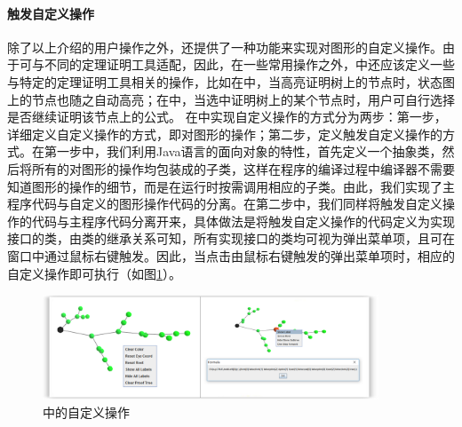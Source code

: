 \paragraph{触发自定义操作}
除了以上介绍的用户操作之外，还提供了一种功能来实现对图形的自定义操作。由于可与不同的定理证明工具适配，因此，在一些常用操作之外，中还应该定义一些与特定的定理证明工具相关的操作，比如在\sctlprov{}中，当高亮证明树上的节点时，状态图上的节点也随之自动高亮；在中，当选中证明树上的某个节点时，用户可自行选择是否继续证明该节点上的公式。
在中实现自定义操作的方式分为两步：第一步，详细定义自定义操作的方式，即对图形的操作；第二步，定义触发自定义操作的方式。在第一步中，我们利用Java语言的面向对象的特性，首先定义一个抽象类，然后将所有的对图形的操作均包装成的子类，这样在程序的编译过程中编译器不需要知道图形的操作的细节，而是在运行时按需调用相应的子类。由此，我们实现了主程序代码与自定义的图形操作代码的分离。在第二步中，我们同样将触发自定义操作的代码与主程序代码分离开来，具体做法是将触发自定义操作的代码定义为实现接口的类，由类的继承关系可知，所有实现接口的类均可视为弹出菜单项，且可在窗口中通过鼠标右键触发。因此，当点击由鼠标右键触发的弹出菜单项时，相应的自定义操作即可执行（如图\ref{vmdv:prooftree:userdefined}）。
\begin{figure}[h!]
	\centering
	\caption{中的自定义操作}
	\label{vmdv:prooftree:userdefined}
	\includegraphics[width=10cm]{Img/user_defined_operation}
	
\end{figure}
